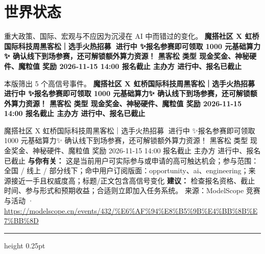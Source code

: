 \documentclass[10.5pt]{ctexart}
\begin{document}
\section*{世界状态}
{\color{ormuted} 重大政策、国际、宏观与不应因为沉浸在 AI 中而错过的变化。}
\vspace{2mm}
{\LARGE\bfseries 魔搭社区 X 虹桥国际科技周黑客松｜选手火热招募🚀 进行中 ✨报名参赛即可领取 1000 元基础算力✨ 确认线下到场参赛，还可解锁额外算力资源！ 黑客松 类型 现金奖金、神秘硬件、魔粒值 奖励 2026-11-15 14:00 报名截止 主办方 进行中、报名已截止}\par
\vspace{1mm}
{\color{ormuted} 本版筛出 5 个高信号事件。}
\vspace{3mm}
{\Large\bfseries 魔搭社区 X 虹桥国际科技周黑客松｜选手火热招募🚀 进行中 ✨报名参赛即可领取 1000 元基础算力✨ 确认线下到场参赛，还可解锁额外算力资源！ 黑客松 类型 现金奖金、神秘硬件、魔粒值 奖励 2026-11-15 14:00 报名截止 主办方 进行中、报名已截止}\par
魔搭社区 X 虹桥国际科技周黑客松｜选手火热招募🚀 进行中 ✨报名参赛即可领取 1000 元基础算力✨ 确认线下到场参赛，还可解锁额外算力资源！ 黑客松 类型 现金奖金、神秘硬件、魔粒值 奖励 2026-11-15 14:00 报名截止 主办方 进行中、报名已截止
\textbf{与你有关：} 这是当前用户可实际参与或申请的高可触达机会；参与范围：全国 / 线上 / 部分线下；命中用户订阅版面：opportunity、ai、engineering；来源接近一手且权威度高；标题/正文包含高信号变化
\textbf{建议：} 检查报名资格、截止时间、参与形式和预期收益；合适则立即加入任务系统。
{\footnotesize\color{ormuted} 来源：ModelScope 竞赛与活动 · \url{https://modelscope.cn/events/432/%E6%AF%94%E8%B5%9B%E4%BB%8B%E7%BB%8D}}
\vspace{4mm}
\hrule height 0.25pt
\vspace{3mm}
\end{document}
